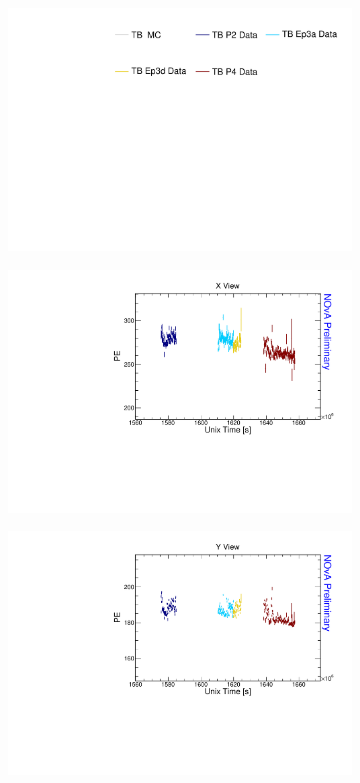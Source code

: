 \begin{figure}[!ht]
  \begin{subfigure}{\textwidth}
    \centering
    \includegraphics[height=0.2\linewidth]{essentialsec_tb/legend.pdf}
  \end{subfigure}
  \vspace*{2mm}
  
  \begin{subfigure}{0.5\textwidth}
    \includegraphics[width=\linewidth]{driftsec_tb/pe_time_x.pdf}
  \end{subfigure}
  \begin{subfigure}{0.5\textwidth}
    \includegraphics[width=\linewidth]{driftsec_tb/pe_time_y.pdf}

\end{subfigure}
\end{figure}
